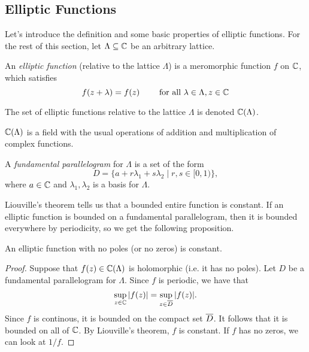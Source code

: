 \subsection{Elliptic Functions}

Let's introduce the definition and some basic properties of elliptic functions.
For the rest of this section,
let $\Lambda \subseteq \mathbb{C}$ be an arbitrary lattice.

\begin{definition}
	An \emph{elliptic function} (relative to the lattice $\Lambda$)
	is a meromorphic function
	$f$ on $\mathbb{C}$, which satisfies
	\begin{equation*}
		f(z + \lambda) = f(z)\qquad\textrm{ for all } \lambda \in \Lambda, z \in \mathbb{C}
	\end{equation*}
\end{definition}

\begin{notation}
	The set of elliptic functions relative to the lattice $\Lambda$ is denoted
	$\mathbb{C}(\Lambda)$.
\end{notation}

\begin{remark}
	$\mathbb{C}(\Lambda)$ is a field with the usual operations of 
	addition and multiplication of complex functions.
\end{remark}

\begin{definition}
	A \emph{fundamental parallelogram} for $\Lambda$ is a set of the form
	\begin{equation*}
		D = \{a + r \lambda_1 + s \lambda_2 \mid r, s \in [0, 1)\},
	\end{equation*}
	where $a \in \mathbb{C}$ and $\lambda_1, \lambda_2$ is a basis for $\Lambda$.
\end{definition}

Liouville's theorem tells us that a bounded entire function is constant.
If an elliptic function is bounded on a fundamental parallelogram, then
it is bounded everywhere by periodicity, so we get the following proposition.

\begin{proposition}
	\label{prop:no-poles}
	An elliptic function with no poles (or no zeros) is constant.
\end{proposition}

\begin{proof}
	Suppose that $f(z)\in \mathbb{C}(\Lambda)$ is holomorphic (i.e. it has no poles).
	Let $D$ be a fundamental
	parallelogram for $\Lambda$. Since $f$ is periodic, we have that
	\begin{equation*}
		\sup_{z \in \mathbb{C}}|f(z)| = \sup_{z \in \overline{D}}|f(z)|.
	\end{equation*}
	Since $f$ is continous, it is bounded on the compact set $\overline{D}$.
	It follows that it is bounded on all of $\mathbb{C}$.
	By Liouville's theorem, $f$ is constant.
	If $f$ has no zeros, we can look at $1/f$.
\end{proof}

